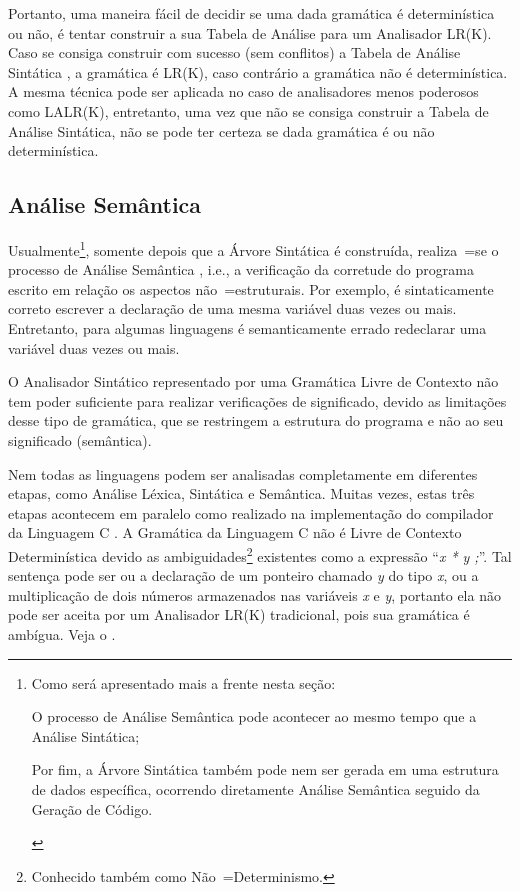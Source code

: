 Portanto,
uma maneira fácil de decidir se uma dada gramática é determinística ou
não,
é tentar construir a sua Tabela de Análise para um Analisador LR(K).
Caso se consiga construir com sucesso (sem conflitos) a Tabela de Análise Sintática \cite{ahoCompilerDragonBook},
a gramática é LR(K),
caso contrário a gramática não é determinística.
A mesma técnica pode ser aplicada no caso de analisadores menos poderosos como LALR(K),
entretanto,
uma vez que não se consiga construir a Tabela de Análise Sintática,
não se pode ter certeza se dada gramática é ou
não determinística.


\subsection{Análise Semântica}
\label{analiseSemantica}

Usualmente\footnote{
Como será apresentado mais a frente nesta seção:
\begin{inparaenum}[1)]
\item O processo de Análise Semântica pode acontecer ao mesmo tempo que a Análise Sintática;
\item Por fim,
a Árvore Sintática também pode nem ser gerada em uma estrutura de dados específica,
ocorrendo diretamente Análise Semântica seguido da Geração de Código.
\end{inparaenum}%
},
somente depois que a Árvore Sintática é construída,
realiza~=se o processo de Análise Semântica \cite{ahoCompilerDragonBook},
i.e.,
a verificação da corretude do programa escrito em relação os aspectos não~=estruturais.
Por exemplo,
é sintaticamente correto escrever a declaração de uma mesma variável duas vezes ou
mais. Entretanto,
para algumas linguagens é semanticamente errado redeclarar uma variável duas vezes ou
mais.

O Analisador Sintático representado por uma Gramática Livre de Contexto não tem poder suficiente para realizar verificações de significado,
devido as limitações desse tipo de gramática,
que se restringem a estrutura do programa e
não ao seu significado (semântica).

Nem todas as linguagens podem ser analisadas completamente em diferentes etapas,
como Análise Léxica, Sintática e Semântica. Muitas vezes,
estas três etapas acontecem em paralelo como realizado na implementação do compilador da Linguagem C \cite{jourdan2017,whyCcannotBeParsedWithALR1Parser}.
A Gramática da Linguagem C não é Livre de Contexto Determinística devido as ambiguidades\footnote{
Conhecido também como Não~=Determinismo.
}
existentes como a expressão ``\textit{x * y ;}''.
Tal sentença pode ser ou
a declaração de um ponteiro chamado \textit{y} do tipo \textit{x},
ou a multiplicação de dois números armazenados nas variáveis \textit{x} e
\textit{y},
portanto ela não pode ser aceita por um Analisador LR(K) tradicional,
pois sua gramática é ambígua.
Veja o .

